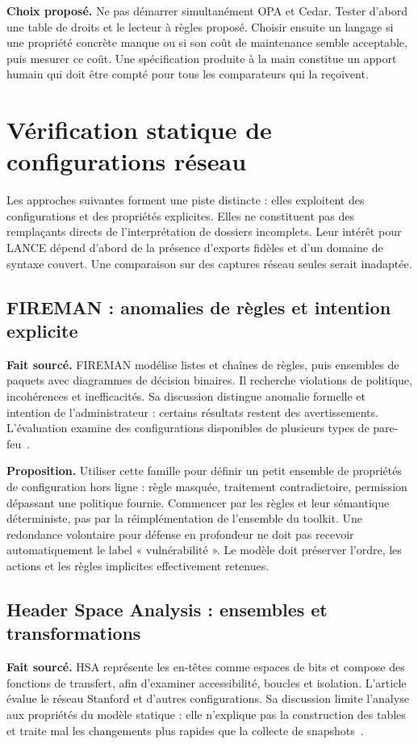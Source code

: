 \documentclass[11pt,a4paper]{article}
\begin{document}
\textbf{Choix proposé.} Ne pas démarrer simultanément OPA et Cedar. Tester
d'abord une table de droits et le lecteur à règles proposé. Choisir ensuite un langage si une propriété
concrète manque ou si son coût de maintenance semble acceptable, puis mesurer
ce coût. Une spécification produite à la main constitue un apport humain
qui doit être compté pour tous les comparateurs qui la reçoivent.

\section{Vérification statique de configurations réseau}
Les approches suivantes forment une piste distincte : elles exploitent des
configurations et des propriétés explicites. Elles ne constituent pas des
remplaçants directs de l'interprétation de dossiers incomplets. Leur intérêt
pour LANCE dépend d'abord de la présence d'exports fidèles et d'un domaine de
syntaxe couvert. Une comparaison sur des captures réseau seules serait inadaptée.

\subsection{FIREMAN : anomalies de règles et intention explicite}
\textbf{Fait sourcé.} FIREMAN modélise listes et chaînes de règles, puis
ensembles de paquets avec diagrammes de décision binaires. Il recherche
violations de politique, incohérences et inefficacités. Sa discussion distingue
anomalie formelle et intention de l'administrateur : certains résultats restent
des avertissements. L'évaluation examine des configurations disponibles de
plusieurs types de pare-feu~\cite{fireman}.

\textbf{Proposition.} Utiliser cette famille pour définir un petit ensemble de
propriétés de configuration hors ligne : règle masquée, traitement contradictoire,
permission dépassant une politique fournie. Commencer par les règles et leur
sémantique déterministe, pas par la réimplémentation de l'ensemble du toolkit.
Une redondance volontaire pour défense en profondeur ne doit pas recevoir
automatiquement le label « vulnérabilité ». Le modèle doit préserver l'ordre,
les actions et les règles implicites effectivement retenues.

\subsection{Header Space Analysis : ensembles et transformations}
\textbf{Fait sourcé.} HSA représente les en-têtes comme espaces de bits et
compose des fonctions de transfert, afin d'examiner accessibilité, boucles et
isolation. L'article évalue le réseau Stanford et d'autres configurations.
Sa discussion limite l'analyse aux propriétés du modèle statique : elle
n'explique pas la construction des tables et traite mal les changements plus
rapides que la collecte de snapshots~\cite{hsa}.
\end{document}
